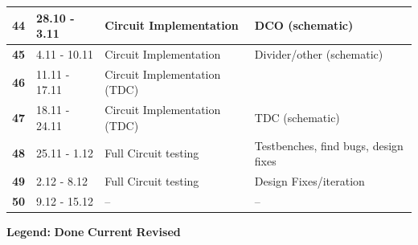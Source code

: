 \documentclass[t, screen, aspectratio=43]{beamer}
\begin{document}
\begin{frame}
\begin{table}[htb!]
\begin{tabular}{|l|l|l|l|}
			\hline 
			\rule[-1ex]{0pt}{2.5ex} \textbf{44}& 28.10 - 3.11& Circuit Implementation& DCO (schematic)\\ 
			\hline 
			\rule[-1ex]{0pt}{2.5ex} \textbf{45}& 4.11 - 10.11& Circuit Implementation& Divider/other (schematic)\\ 
			\hline 
			\rule[-1ex]{0pt}{2.5ex} \textbf{46}& 11.11 - 17.11& Circuit Implementation (TDC)& \\ 
			\hline 
			\rule[-1ex]{0pt}{2.5ex} \textbf{47}& 18.11 - 24.11& Circuit Implementation (TDC)& TDC (schematic)\\ 
			\hline 
			\rule[-1ex]{0pt}{2.5ex} \textbf{48}& 25.11 - 1.12& Full Circuit testing & Testbenches, find bugs, design fixes\\ 
			\hline 
			\rule[-1ex]{0pt}{2.5ex} \textbf{49}& 2.12 - 8.12& Full Circuit testing& Design Fixes/iteration\\ 
			\hline 
			\rule[-1ex]{0pt}{2.5ex} \textbf{50}& 9.12 - 15.12& --& --\\ 
			\hline 
		\end{tabular}
		\begin{flushleft}\textbf{Legend:} \colorbox{red!20}{\textbf{Done}} \colorbox{green!20}{\textbf{Current}}  \colorbox{blue!20}{\textbf{Revised}}
		\end{flushleft}
	\end{table}   
\end{frame}


\end{document}

